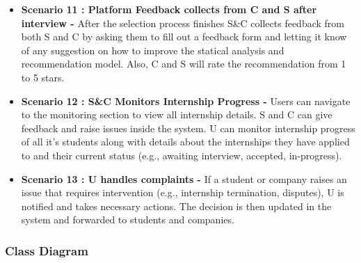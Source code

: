 \begin{itemize}
    \item \textbf{Scenario 11 : Platform Feedback collects from C and S after interview - } After the selection process finishes S\&C collects feedback from both S and C by asking them to fill out a feedback form and letting it know of any suggestion on how to improve the statical analysis and  recommendation model. Also, C and S will rate the recommendation from 1 to 5 stars.
    
    \item \textbf{Scenario 12 : S\&C Monitors Internship Progress - } Users can  navigate to the monitoring section to view all internship details. S and C can give feedback and raise issues inside the system. U can monitor internship progress of all it's students along with details about the internships they have applied to and their current status (e.g., awaiting interview, accepted, in-progress).

    \item \textbf{Scenario 13 : U handles complaints - } If a student or company raises an issue that requires intervention (e.g., internship termination, disputes), U is notified and takes necessary actions. The decision is then updated in the system and forwarded to students and companies.
\end{itemize}

\subsubsection{Class Diagram}

